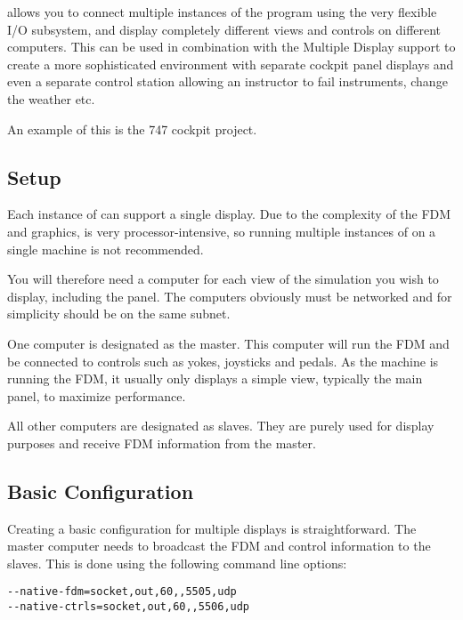 \FlightGear{} allows you to connect multiple instances of the program
using the very flexible I/O subsystem, and display completely different views
 and controls on different computers. This can be used in combination
 with the Multiple Display support to create a more sophisticated environment
 with separate cockpit panel displays and even a separate control
station allowing an instructor to fail instruments, change the weather etc.

An example of this is the 747 cockpit project.

\noindent
{}

\subsection{Setup}

Each instance of \FlightGear{} can support a single display. Due to the
complexity of the FDM and graphics, \FlightGear{} is very processor-intensive,
so running multiple instances of \FlightGear{} on a single machine is not
recommended.

You will therefore need a computer for each view of the simulation you wish
to display, including the panel. The computers obviously must be networked
and for simplicity should be on the same subnet.

One computer is designated as the master. This computer will run the FDM and
be connected to controls such as yokes, joysticks and pedals. As the machine is
running the FDM, it usually only displays a simple view, typically the main
panel, to maximize performance.

All other computers are designated as slaves. They are purely used for display
purposes and receive FDM information from the master.

\subsection{Basic Configuration}

Creating a basic configuration for multiple displays is straightforward. The
master computer needs to broadcast the FDM and control information to the slaves.
This is done using the following command line options:

\begin{verbatim}
--native-fdm=socket,out,60,,5505,udp
--native-ctrls=socket,out,60,,5506,udp
\end{verbatim}

